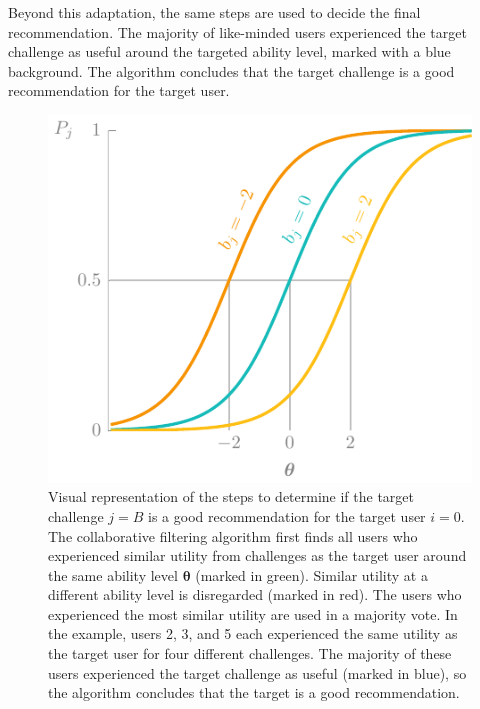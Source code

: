 Beyond this adaptation, the same steps are used to decide the final recommendation.
The majority of like-minded users experienced the target challenge as useful around the targeted ability level, marked with a blue background.
The algorithm concludes that the target challenge is a good recommendation for the target user.

\begin{figure}
    \centering
    \includegraphics[page=3]{03-education/figures/tikzfigures.pdf}
    \caption[Adapted collaborative filtering algorithm]{Visual representation of the steps to determine if the target challenge $j=B$ is a good recommendation for the target user $i=0$. 
    The collaborative filtering algorithm first finds all users who experienced similar utility from challenges as the target user around the same ability level $\bm\theta$ (marked in green). 
    Similar utility at a different ability level is disregarded (marked in red).
    The users who experienced the most similar utility are used in a majority vote. 
    In the example, users 2, 3, and 5 each experienced the same utility as the target user for four different challenges.
    The majority of these users experienced the target challenge as useful (marked in blue), so the algorithm concludes that the target is a good recommendation.}
    \label{fig:3d-cf}
\end{figure}

